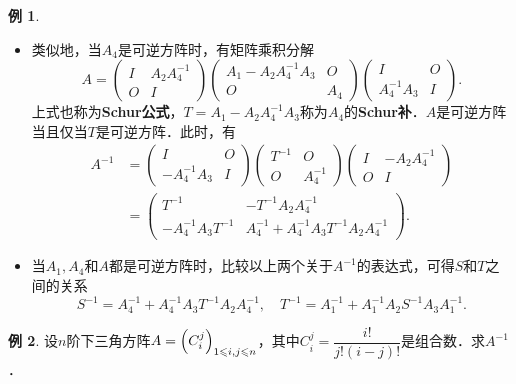 \documentclass[a4paper,fontset=windows]{ctexbook}
\theoremstyle{definition}
\newtheorem{example}{例}[chapter]
\renewcommand{\le}{\leqslant}
\begin{document}
\begin{example}
\begin{itemize}
\item 类似地，当$A_4$是可逆方阵时，有矩阵乘积分解
$$A=\begin{pmatrix}I&A_2A_4^{-1} \\ O&I\end{pmatrix}\begin{pmatrix}A_1-A_2A_4^{-1}A_3&O \\ O&A_4\end{pmatrix}\begin{pmatrix}I&O \\ A_4^{-1}A_3&I\end{pmatrix}.$$
上式也称为{\bf Schur公式}，$T=A_1-A_2A_4^{-1}A_3$称为$A_4$的{\bf Schur补}．$A$是可逆方阵当且仅当$T$是可逆方阵．此时，有
\begin{align*}
A^{-1}&=\begin{pmatrix}I&O \\ -A_4^{-1}A_3&I\end{pmatrix}\begin{pmatrix}T^{-1}&O \\ O&A_4^{-1}\end{pmatrix}\begin{pmatrix}I&-A_2A_4^{-1} \\ O&I\end{pmatrix} \\
&=\begin{pmatrix}T^{-1}&-T^{-1}A_2A_4^{-1} \\ -A_4^{-1}A_3T^{-1}&A_4^{-1}+A_4^{-1}A_3T^{-1}A_2A_4^{-1}\end{pmatrix}.
\end{align*}

\item 当$A_1,A_4$和$A$都是可逆方阵时，比较以上两个关于$A^{-1}$的表达式，可得$S$和$T$之间的关系
$$S^{-1}=A_4^{-1}+A_4^{-1}A_3T^{-1}A_2A_4^{-1},\quad T^{-1}=A_1^{-1}+A_1^{-1}A_2S^{-1}A_3A_1^{-1}.$$
\end{itemize}
\end{example}

\begin{example}
设$n$阶下三角方阵$A=\Bigl(C_i^j\Bigr)_{1\le i,j\le n}$，其中$C_i^j=\dfrac{i!}{j!(i-j)!}$是组合数．求$A^{-1}$．
\end{example}
\end{document}
